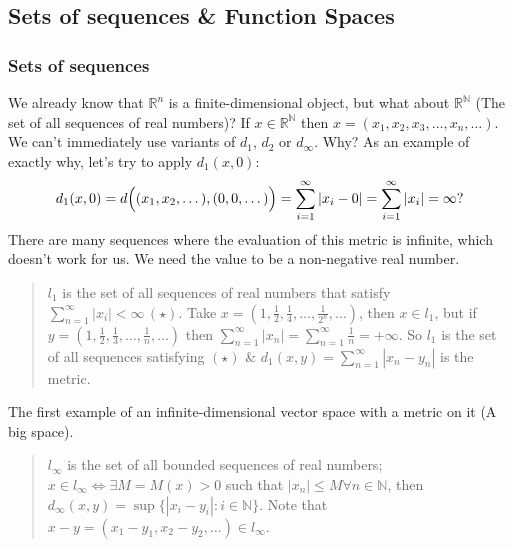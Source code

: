 \documentclass[10pt]{article}
\begin{document}
\subsection{Sets of sequences \& Function Spaces}
\subsubsection{Sets of sequences}
We already know that $\mathbb{R}^{n}$ is a finite-dimensional object, but what about $\mathbb{R}^{\mathbb{N}}$ (The set of all sequences of real numbers)? If $x\in\mathbb{R}^{\mathbb{N}}$ then $x=(x_{1}, x_{2}, x_{3}, \dots, x_{n}, \dots)$. We can't immediately use variants of $d_{1}$, $d_{2}$ or $d_{\infty}$. Why? As an example of exactly why, let's try to apply $d_{1}(x,0)$:
\begin{equation*}
    d_{1}(x,0)=d\Big{(}(x_{1},x_{2},\dots),(0,0,\dots)\Big{)}=\sum^{\infty}_{i=1}|x_{i}-0|=\sum^{\infty}_{i=1}|x_{i}|=\infty?
\end{equation*}
There are many sequences where the evaluation of this metric is infinite, which doesn't work for us. We need the value to be a non-negative real number.
\begin{quote}
$l_{1}$ is the set of all sequences of real numbers that satisfy $\sum^{\infty}_{n=1}|x_{i}|<\infty\,(\star)$. Take $x=(1,\frac{1}{2}, \frac{1}{4}, \dots, \frac{1}{2^{n}}, \dots)$, then $x\in l_{1}$, but if $y=(1, \frac{1}{2}, \frac{1}{3}, \dots, \frac{1}{n}, \dots)$ then $\sum^{\infty}_{n=1}|x_{n}|=\sum^{\infty}_{n=1}\frac{1}{n}=+\infty$. So $l_{1}$ is the set of all sequences satisfying $(\star)$ \& $d_{1}(x,y)=\sum^{\infty}_{n=1}|x_{n}-y_{n}|$ is the metric. 
\end{quote}
The first example of an infinite-dimensional vector space with a metric on it (A big space).
\begin{quote}
    $l_{\infty}$ is the set of all bounded sequences of real numbers; $x\in l_{\infty}\iff\exists M=M(x)>0$ such that $|x_{n}|\leq M \forall n\in\mathbb{N}$, then $d_{\infty}(x,y)=\sup\{|x_{i}-y_{i}|:i\in\mathbb{N}\}$. Note that $x-y=(x_{1}-y_{1}, x_{2}-y_{2}, \dots)\in l_{\infty}$.
\end{quote}
\end{document}
